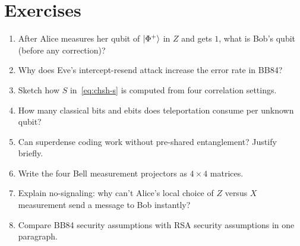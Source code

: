 \section*{Exercises}
\begin{enumerate}[label=\arabic*.]
\item After Alice measures her qubit of $\ket{\Phi^+}$ in $Z$ and gets $1$, what is Bob's qubit (before any correction)?
\item Why does Eve's intercept-resend attack increase the error rate in BB84?
\item Sketch how $S$ in~\eqref{eq:chsh-s} is computed from four correlation settings.
\item How many classical bits and ebits does teleportation consume per unknown qubit?
\item Can superdense coding work without pre-shared entanglement? Justify briefly.
\item Write the four Bell measurement projectors as $4\times 4$ matrices.
\item Explain no-signaling: why can't Alice's local choice of $Z$ versus $X$ measurement send a message to Bob instantly?
\item Compare BB84 security assumptions with RSA security assumptions in one paragraph.
\end{enumerate}
